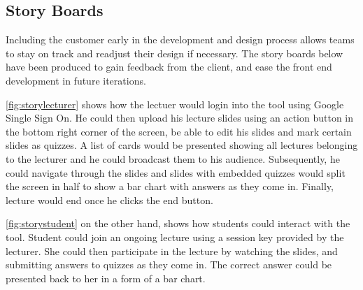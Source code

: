 \subsection{Story Boards}
Including the customer
early in the development and design process allows teams to stay on track and readjust
their design if necessary. The story boards below have been produced to gain feedback
from the client, and ease the front end development in future iterations.

\autoref{fig:storylecturer} shows how the lectuer would login into the tool using
Google Single Sign On. He could then upload his lecture slides using an action
button in the bottom right corner of the screen, be able to edit his slides and
mark certain slides as quizzes. A list of cards would be presented showing all
lectures belonging to the lecturer and he could broadcast them to his audience.
Subsequently, he could navigate through the slides and slides with embedded quizzes would
split the screen in half to show a bar chart with answers as they come in. Finally,
lecture would end once he clicks the end button.

\autoref{fig:storystudent} on the other hand, shows how students could interact with
the tool. Student could join an ongoing lecture using a session key provided by the
lecturer. She could then participate in the lecture by watching the slides, and
submitting answers to quizzes as they come in. The correct answer could be presented
back to her in a form of a bar chart.

